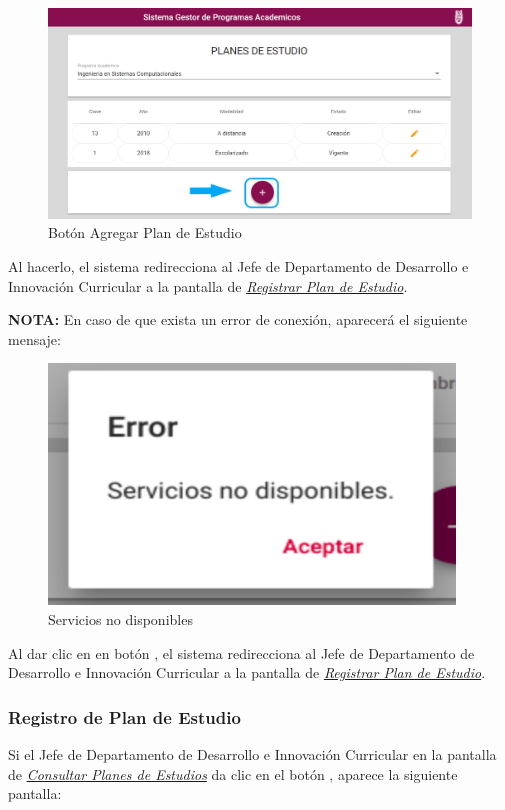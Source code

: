 \begin{figure}[H]
	\centering
	\hypertarget{add}{\includegraphics[width=0.7\linewidth]{images/SP4-GPE/mas}}
	\caption{Botón Agregar Plan de Estudio}
	\label{add}
\end{figure}

Al hacerlo, el sistema redirecciona al Jefe de Departamento de Desarrollo e Innovación Curricular a la pantalla de \hyperlink{registrarPE}{\textit{Registrar Plan de Estudio}}.


\textbf{NOTA:} En caso de que exista un error de conexión, aparecerá el siguiente mensaje:
	\begin{figure}[H]
	\centering
	\hypertarget{error}{\includegraphics[width=0.7\linewidth]{images/SP4-GPE/error}}
	\caption{Servicios no disponibles}
	\label{error}
\end{figure}

Al dar clic en en botón , el sistema redirecciona  al Jefe de Departamento de Desarrollo e Innovación Curricular a la pantalla de \hyperlink{registrarPE}{\textit{Registrar Plan de Estudio}}.
\newpage
\subsubsection{Registro de Plan de Estudio}
Si el Jefe de Departamento de Desarrollo e Innovación Curricular en la pantalla de \hyperlink{consultarPE}{\textit{Consultar Planes de Estudios}} da clic en el botón \IUbutton{+}, aparece la siguiente pantalla:


